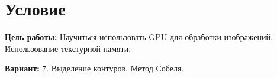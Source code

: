 \section{Условие}
\textbf{Цель работы:} Научиться использовать GPU для обработки изображений. Использование текстурной памяти.

\textbf{Вариант:} 7. Выделение контуров. Метод Собеля.
